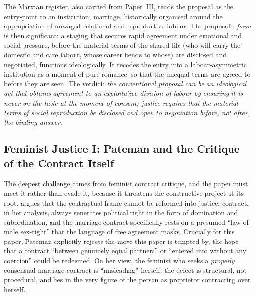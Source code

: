 The Marxian register, also carried from Paper~III, reads the proposal as the entry-point to an institution, marriage, historically organised around the appropriation of unwaged relational and reproductive labour. The proposal's \emph{form} is then significant: a staging that secures rapid agreement under emotional and social pressure, before the material terms of the shared life (who will carry the domestic and care labour, whose career bends to whose) are disclosed and negotiated, functions ideologically. It recodes the entry into a labour-asymmetric institution as a moment of pure romance, so that the unequal terms are agreed to before they are seen. The verdict: \emph{the conventional proposal can be an ideological act that obtains agreement to an exploitative division of labour by ensuring it is never on the table at the moment of consent; justice requires that the material terms of social reproduction be disclosed and open to negotiation before, not after, the binding answer}.

\subsection{Feminist Justice I: Pateman and the Critique of the Contract Itself}\label{p06:sec:pateman}

The deepest challenge comes from feminist contract critique, and the paper must meet it rather than evade it, because it threatens the constructive project at its root. \textcite{pateman1988sexual} argues that the contractual frame cannot be reformed into justice: contract, in her analysis, always generates political right in the form of domination and subordination, and the marriage contract specifically rests on a presumed ``law of male sex-right'' that the language of free agreement masks. Crucially for this paper, Pateman explicitly rejects the move this paper is tempted by, the hope that a contract ``between genuinely equal partners'' or ``entered into without any coercion'' could be redeemed. On her view, the feminist who seeks a \emph{properly} consensual marriage contract is ``misleading'' herself: the defect is structural, not procedural, and lies in the very figure of the person as proprietor contracting over herself.

